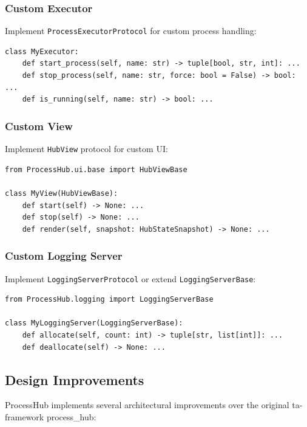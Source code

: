 \subsubsection{Custom Executor}

Implement \texttt{ProcessExecutorProtocol} for custom process handling:

\begin{verbatim}
class MyExecutor:
    def start_process(self, name: str) -> tuple[bool, str, int]: ...
    def stop_process(self, name: str, force: bool = False) -> bool: ...
    def is_running(self, name: str) -> bool: ...
\end{verbatim}

\subsubsection{Custom View}

Implement \texttt{HubView} protocol for custom UI:

\begin{verbatim}
from ProcessHub.ui.base import HubViewBase

class MyView(HubViewBase):
    def start(self) -> None: ...
    def stop(self) -> None: ...
    def render(self, snapshot: HubStateSnapshot) -> None: ...
\end{verbatim}

\subsubsection{Custom Logging Server}

Implement \texttt{LoggingServerProtocol} or extend \texttt{LoggingServerBase}:

\begin{verbatim}
from ProcessHub.logging import LoggingServerBase

class MyLoggingServer(LoggingServerBase):
    def allocate(self, count: int) -> tuple[str, list[int]]: ...
    def deallocate(self) -> None: ...
\end{verbatim}

\subsection{Design Improvements}

ProcessHub implements several architectural improvements over the original ta-framework process\_hub:

